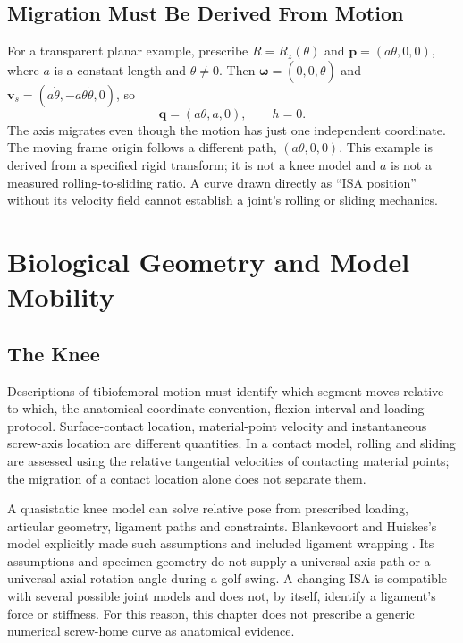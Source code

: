 \subsection{Migration Must Be Derived From Motion}

For a transparent planar example, prescribe $R=R_z(\theta)$ and
$\bm p=(a\theta,0,0)$, where $a$ is a constant length and $\dot\theta\ne0$.
Then $\bm\omega=(0,0,\dot\theta)$ and
$\bm v_s=(a\dot\theta,-a\theta\dot\theta,0)$, so
\begin{equation}
 \bm q=(a\theta,a,0),\qquad h=0.
\end{equation}
The axis migrates even though the motion has just one independent coordinate.
The moving frame origin follows a different path, $(a\theta,0,0)$. This example
is derived from a specified rigid transform; it is not a knee model and $a$ is
not a measured rolling-to-sliding ratio. A curve drawn directly as ``ISA position''
without its velocity field cannot establish a joint's rolling or sliding mechanics.

\section{Biological Geometry and Model Mobility}

\subsection{The Knee}

Descriptions of tibiofemoral motion must identify which segment moves relative to
which, the anatomical coordinate convention, flexion interval and loading protocol.
Surface-contact location, material-point velocity and instantaneous screw-axis
location are different quantities. In a contact model, rolling and sliding are
assessed using the relative tangential velocities of contacting material points;
the migration of a contact location alone does not separate them.

A quasistatic knee model can solve relative pose from prescribed loading,
articular geometry, ligament paths and constraints. Blankevoort and Huiskes's
model explicitly made such assumptions and included ligament wrapping
\cite{Blankevoort1991}. Its assumptions and specimen geometry do not supply a
universal axis path or a universal axial rotation angle during a golf swing.
A changing ISA is compatible with several possible joint models and does not,
by itself, identify a ligament's force or stiffness. For this reason, this chapter
does not prescribe a generic numerical screw-home curve as anatomical evidence.


